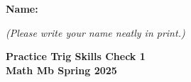 \documentclass{article}
\begin{document}
 

 \noindent
{\large \mbox{} \hfill \bf Name:\underline{\hspace{2.8in}}}

 {\mbox{} \hfill \it (Please write your name neatly in print.)}


 
\medskip
 
\noindent
{\large\bf
Practice Trig Skills Check 1 \\ Math Mb Spring 2025}
\noindent

\end{document}
